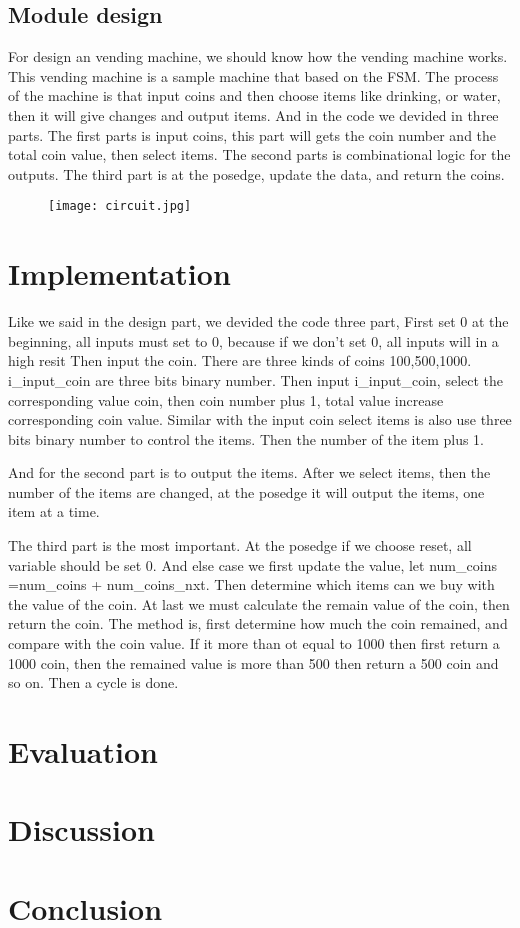 \documentclass[12pt,a4paper]{article}
\begin{document}
\subsection{Module design}

For design an vending machine, we should know how the vending machine works.
This vending machine is a sample machine that based on the FSM.
The process of the machine is that input coins and then choose items like drinking, or water, then it will give changes and output items.
And in the code we devided in three parts. 
The first parts is input coins, this part will gets the coin number and the total coin value, then select items.
The second parts is combinational logic for the outputs.
The third part is at the posedge, update the data, and return the coins. 


\begin{figure}[H]
  \centering
  \texttt{[image: circuit.jpg]}
  \end{figure}


\newpage

\section{Implementation}

Like we said in the design part, we devided the code three part,
First set 0 at the beginning, all inputs must set to 0, because if we don't set 0, all inputs will in a high resit
Then input the coin. There are three kinds of coins 100,500,1000.
i_input_coin are three bits binary number. 
Then input i_input_coin, select the corresponding value coin, then coin number plus 1, total value increase corresponding coin value.
Similar with the input coin select items is also use three bits binary number to control the items.
Then the number of the item plus 1.

And for the second part is to output the items. 
After we select items, then the number of the items are changed, at the posedge it will output the items, one item at a time.

The third part is the most important.
At the posedge if we choose reset, all variable should be set 0.
And else case we first update the value, let num_coins =num_coins + num_coins_nxt.
Then determine which items can we buy with the value of the coin.
At last we must calculate the remain value of the coin, then return the coin.
The method is, first determine how much the coin remained, and compare with the coin value.
If it more than ot equal to 1000 then first return a 1000 coin, then the remained value is more than 500 then return a 500 coin and so on.
Then a cycle is done.  


\newpage

\section{Evaluation}



\newpage
\section{Discussion}



\section{Conclusion}
\end{document}
